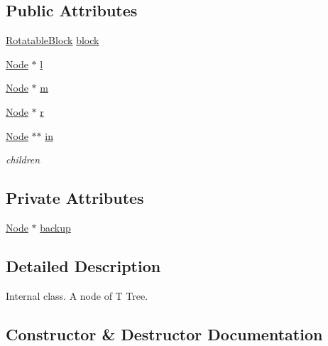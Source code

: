 \subsection*{Public Attributes}
\begin{DoxyCompactItemize}
\item 
\hyperlink{structRotatableBlock}{Rotatable\+Block} \hyperlink{classTTree_1_1Node_a100664635a89fa354373102768bd22be}{block}
\item 
\hyperlink{classTTree_1_1Node}{Node} $\ast$ \hyperlink{classTTree_1_1Node_a78f1bf067928d0e0106e1187364cc69e}{l}
\item 
\hyperlink{classTTree_1_1Node}{Node} $\ast$ \hyperlink{classTTree_1_1Node_a3f47f1068b4631b1d9eddea0300c6bee}{m}
\item 
\hyperlink{classTTree_1_1Node}{Node} $\ast$ \hyperlink{classTTree_1_1Node_adb67ed846e6787b3ff26bbcee11ee4b6}{r}
\item 
\hyperlink{classTTree_1_1Node}{Node} $\ast$$\ast$ \hyperlink{classTTree_1_1Node_ab126c67191b7e91a1eccc18a3eeadf0b}{in}
\begin{DoxyCompactList}\small\item\em children \end{DoxyCompactList}\end{DoxyCompactItemize}
\subsection*{Private Attributes}
\begin{DoxyCompactItemize}
\item 
\hyperlink{classTTree_1_1Node}{Node} $\ast$ \hyperlink{classTTree_1_1Node_aa37644a8130b8ea9bd3d3a7d1fcf360b}{backup}
\end{DoxyCompactItemize}


\subsection{Detailed Description}
Internal class. A node of T Tree. 

\subsection{Constructor \& Destructor Documentation}
\hypertarget{classTTree_1_1Node_a73f229145664a7b5ce0c41746ba4e881}{}
